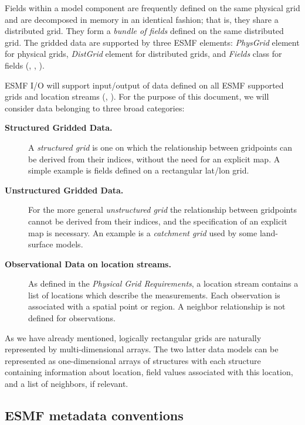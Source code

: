 Fields within a model component are frequently defined on the same
physical grid and are decomposed in memory in an identical fashion;
that is, they share a distributed grid. They form a {\em bundle of
fields} defined on the same distributed grid. The gridded data are
supported by three ESMF elements: {\em PhysGrid} element 
for physical grids, {\em DistGrid} element for distributed grids, and 
{\em Fields} class for fields (\cite{ESMF-PhysGrid-Req},
\cite{ESMF-DistGrid-Req}, \cite{ESMF-Field-Req}). 

ESMF I/O will support input/output of data defined on all ESMF
supported grids and location streams (\cite{ESMF-PhysGrid-Req},
\cite{ESMF-DistGrid-Req}). For
the purpose of this document, we will consider data belonging to three
broad categories:

\begin{description}

\item[\bf Structured Gridded Data.] A {\em structured grid} is one on 
which the relationship between gridpoints can be derived from their
indices, without the need for an explicit map.  A simple example is fields
defined on a rectangular lat/lon grid.

\item[\bf Unstructured Gridded Data.] For the more general 
{\em unstructured grid} the relationship between gridpoints cannot be
derived from their indices, and the specification of an explicit map
is necessary.  An example is a {\em catchment grid} used by some
land-surface models.

\item[\bf Observational Data on location streams.] As defined in 
the {\em Physical Grid Requirements}, a location stream contains 
a list of locations which 
describe the measurements. Each observation is 
associated with a spatial point or region. A neighbor relationship is not 
defined for observations. 
\end{description}

As we have already mentioned, logically rectangular grids are naturally 
represented by multi-dimensional arrays. The two latter data models can be 
represented as one-dimensional arrays of structures with each structure 
containing information about location, field values associated with this 
location, and a list of neighbors, if relevant. 

\subsection{ESMF metadata conventions}

